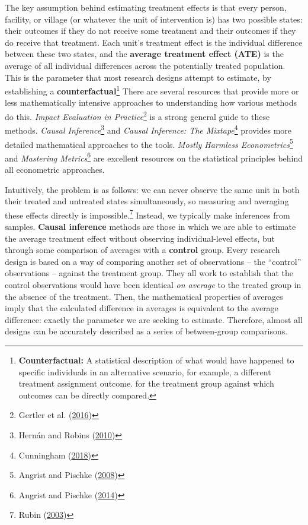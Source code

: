\documentclass[
]{book}
\begin{document}
The key assumption behind estimating treatment effects is that every
person, facility, or village (or whatever the unit of intervention is)
has two possible states: their outcomes if they do not receive some treatment
and their outcomes if they do receive that treatment.
Each unit's treatment effect is the individual difference between these two states,
and the \textbf{average treatment effect (ATE)} is the average of all
individual differences across the potentially treated population.
This is the parameter that most research designs attempt to estimate,
by establishing a \textbf{counterfactual}\footnote{\textbf{Counterfactual:} A statistical description of what would have happened to specific individuals in an alternative scenario,
  for example, a different treatment assignment outcome. for the treatment group against which outcomes can be directly compared.}
There are several resources that provide more or less mathematically intensive
approaches to understanding how various methods do this.
\emph{Impact Evaluation in Practice}\footnote{Gertler et al. (\protect\hyperlink{ref-gertler2016impact}{2016})}
is a strong general guide to these methods.
\emph{Causal Inference}\footnote{Hernán and Robins (\protect\hyperlink{ref-hernan2010causal}{2010})} and
\emph{Causal Inference: The Mixtape}\footnote{Cunningham (\protect\hyperlink{ref-cunningham2018causal}{2018})}
provides more detailed mathematical approaches to the tools.
\emph{Mostly Harmless Econometrics}\footnote{Angrist and Pischke (\protect\hyperlink{ref-angrist2008mostly}{2008})}
and \emph{Mastering Metrics}\footnote{Angrist and Pischke (\protect\hyperlink{ref-angrist2014mastering}{2014})}
are excellent resources on the statistical principles behind all econometric approaches.

Intuitively, the problem is as follows: we can never observe the same unit
in both their treated and untreated states simultaneously,
so measuring and averaging these effects directly is impossible.\footnote{Rubin (\protect\hyperlink{ref-rubin2003basic}{2003})}
Instead, we typically make inferences from samples.
\textbf{Causal inference} methods are those in which we are able to estimate the
average treatment effect without observing individual-level effects,
but through some comparison of averages with a \textbf{control} group.
Every research design is based on a way of comparing another set of observations --
the ``control'' observations -- against the treatment group.
They all work to establish that the control observations would have been
identical \emph{on average} to the treated group in the absence of the treatment.
Then, the mathematical properties of averages imply that the calculated
difference in averages is equivalent to the average difference:
exactly the parameter we are seeking to estimate.
Therefore, almost all designs can be accurately described
as a series of between-group comparisons.
\end{document}
